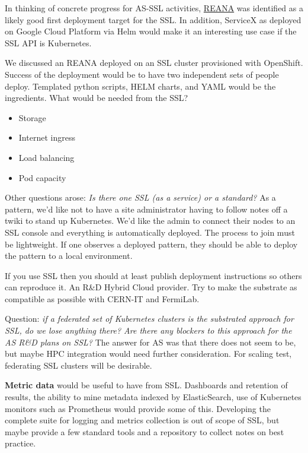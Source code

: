\documentclass[11pt,letterpaper,fleqn]{article}
\begin{document}
In thinking of concrete progress for AS-SSL activities, \href{http://www.reanahub.io/}{REANA} was identified as a likely good first deployment target for the SSL. In addition, ServiceX as deployed on Google Cloud Platform via Helm would make it an interesting use case if the SSL API is Kubernetes.

We discussed an REANA deployed on an SSL cluster provisioned with OpenShift. Success of the deployment would be to have two independent sets of people deploy. Templated python scripts, HELM charts, and YAML would be the ingredients.  What would be needed from the SSL?

\begin{itemize}
  \item Storage
  \item Internet ingress
  \item Load balancing
  \item Pod capacity
\end{itemize}

Other questions arose: {\it Is there one SSL (as a service) or a standard?} As a pattern, we'd like not to have a site administrator having to follow notes off a twiki to stand up Kubernetes. We’d like the admin to connect their nodes to an SSL console and everything is automatically deployed. The process to join must be lightweight. If one observes a deployed pattern, they should be able to deploy the pattern to a local environment.

If you use SSL then you should at least publish deployment instructions so others can reproduce it. An R\&D Hybrid Cloud provider. Try to make the substrate as compatible as possible with CERN-IT and FermiLab.

Question: {\it if a federated set of Kubernetes clusters is the substrated approach for SSL, do we lose anything there? Are there any blockers to this approach for the AS R\&D plans on SSL?}  The answer for AS was that there does not seem to be, but maybe HPC integration would need further consideration. For scaling test, federating SSL clusters will be desirable.

{\bf Metric data} would be useful to have from SSL.  Dashboards and retention of results, the ability to mine metadata indexed by ElasticSearch, use of Kubernetes monitors such as Prometheus would provide some of this.  Developing the complete suite for logging and metrics collection is out of scope of SSL, but maybe provide a few standard tools and a repository to collect notes on best practice.
\end{document}
